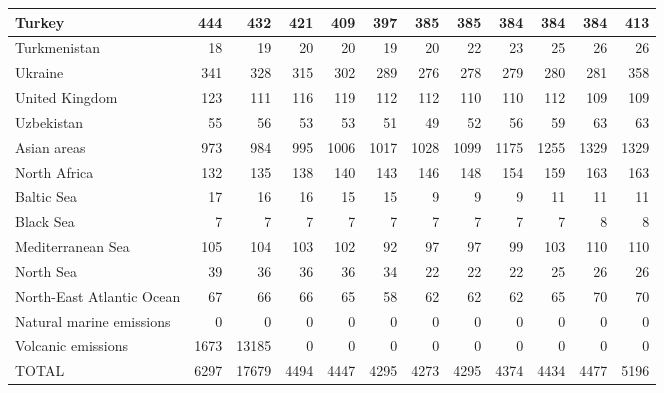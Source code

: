 \begin{table}
\begin{tabular}{|l|r|r|r|r|r|r|r|r|r|r|r|}
                        Turkey&    444&    432&    421&    409&    397&    385&    385&    384&    384&    384&    413\\\hline
                  Turkmenistan&     18&     19&     20&     20&     19&     20&     22&     23&     25&     26&     26\\\hline
                       Ukraine&    341&    328&    315&    302&    289&    276&    278&    279&    280&    281&    358\\\hline
                United Kingdom&    123&    111&    116&    119&    112&    112&    110&    110&    112&    109&    109\\\hline
                    Uzbekistan&     55&     56&     53&     53&     51&     49&     52&     56&     59&     63&     63\\\hline
                   Asian areas&    973&    984&    995&   1006&   1017&   1028&   1099&   1175&   1255&   1329&   1329\\\hline
                  North Africa&    132&    135&    138&    140&    143&    146&    148&    154&    159&    163&    163\\\hline
                    Baltic Sea&     17&     16&     16&     15&     15&      9&      9&      9&     11&     11&     11\\\hline
                     Black Sea&      7&      7&      7&      7&      7&      7&      7&      7&      7&      8&      8\\\hline
             Mediterranean Sea&    105&    104&    103&    102&     92&     97&     97&     99&    103&    110&    110\\\hline
                     North Sea&     39&     36&     36&     36&     34&     22&     22&     22&     25&     26&     26\\\hline
     North-East Atlantic Ocean&     67&     66&     66&     65&     58&     62&     62&     62&     65&     70&     70\\\hline
      Natural marine emissions&      0&      0&      0&      0&      0&      0&      0&      0&      0&      0&      0\\\hline
            Volcanic emissions&   1673&  13185&      0&      0&      0&      0&      0&      0&      0&      0&      0\\\hline\hline
                         TOTAL&   6297&  17679&   4494&   4447&   4295&   4273&   4295&   4374&   4434&   4477&   5196\\\hline
 \end{tabular}
 \end{table}
 
